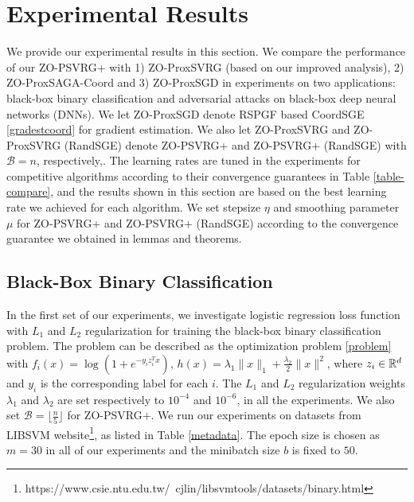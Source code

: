 \section{Experimental Results}
We provide our experimental results in this section. We compare the performance of
our ZO-PSVRG+  with 1) ZO-ProxSVRG (based on our improved analysis), 2) ZO-ProxSAGA-Coord \cite{gu2018faster} and 3) ZO-ProxSGD \cite{ghadimi2016accelerated} in experiments on two applications: black-box binary classification and adversarial attacks on black-box deep neural networks
(DNNs). We let ZO-ProxSGD denote RSPGF based CoordSGE \eqref{gradestcoord} for gradient estimation. We also let ZO-ProxSVRG and ZO-ProxSVRG (RandSGE) denote ZO-PSVRG+  and ZO-PSVRG+ (RandSGE) with $\mathcal{B} = n$, respectively,. The learning rates are tuned in the experiments for competitive algorithms  according to their convergence guarantees in Table \ref{table-compare}, and the results shown in this section are based on the best learning rate we achieved for each algorithm. We set stepsize $\eta$ and smoothing parameter $\mu$ for ZO-PSVRG+ and ZO-PSVRG+ (RandSGE) according to the convergence guarantee we obtained in lemmas and theorems.
\subsection{Black-Box Binary Classification}
In the first set of our experiments, we investigate logistic regression loss function with $L_1$ and $L_2$ regularization for training the black-box binary classification problem. The problem can be described as the optimization problem \eqref{problem} with $f_i(x) = \log(1+e^{-y_iz^T_i{x}})$, $h(x) = \lambda_1\|{x}\|_1 + \frac{\lambda_2}{2}\|{x}\|^2$, where $z_i\in\mathbb{R}^d$ and $y_i$ is the corresponding label for each $i$. The $L_1$ and $L_2$ regularization weights $\lambda_1$ and $\lambda_2$ are set respectively to $10^{-4}$ and $10^{-6}$, in all the experiments. We also set $\mathcal{B} = \lfloor{\frac{n}{5}}\rfloor$ for ZO-PSVRG+. We run our experiments on datasets from LIBSVM website{\footnote{https://www.csie.ntu.edu.tw/~cjlin/libsvmtools/datasets/binary.html}}, as listed in Table \ref{metadata}. The epoch size  is chosen as $m = 30$ in all of our experiments and the minibatch size  $b$ is fixed to $50$.  

